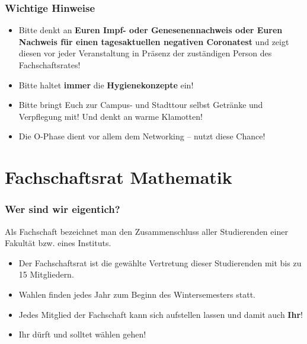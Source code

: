\documentclass[10pt]{beamer}
\makeatletter
\newcommand{\highl}[1]{\color{tuccolor@ma}#1\color{black}}
\makeatother
\begin{document}
\begin{frame}
	\frametitle{Wichtige Hinweise}
	\begin{itemize}
		\item Bitte denkt an \textbf{Euren Impf- oder Genesenennachweis oder Euren Nachweis für einen tagesaktuellen negativen Coronatest} und zeigt diesen vor jeder Veranstaltung in Präsenz der zuständigen Person des Fachschaftsrates!
		\item Bitte haltet \textbf{immer} die \textbf{Hygienekonzepte} ein!
		\item Bitte bringt Euch zur Campus- und Stadttour selbst Getränke und Verpflegung mit! Und denkt an warme Klamotten!
		\item \highl{Die O-Phase dient vor allem dem Networking -- nutzt diese Chance!}
	\end{itemize}
\end{frame}


\section{Fachschaftsrat Mathematik}
\frame{\tableofcontents[currentsection]}

\begin{frame}
	\frametitle{Wer sind wir eigentich?}

	\begin{block}{\vphantom{X}}
		Als Fachschaft bezeichnet man den Zusammenschluss aller Studierenden einer Fakultät bzw. eines Instituts.
	\end{block}

	\begin{itemize}
		\item Der Fachschaftsrat ist die gewählte Vertretung dieser Studierenden mit bis zu 15 Mitgliedern.
		\item Wahlen finden jedes Jahr zum Beginn des Wintersemesters statt.
		\item Jedes Mitglied der Fachschaft kann sich aufstellen lassen und damit auch \textbf{Ihr}!
		\item \highl{Ihr dürft und solltet wählen gehen!}
	\end{itemize}
\end{frame}
\end{document}
